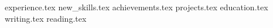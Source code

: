 \documentclass[11pt, a4paper]{awesome-cv}
\newcommand*{\sectiondir}{resume/}
\begin{document}
\makecvheader

{experience.tex}
{new_skills.tex}
{achievements.tex}
{projects.tex}
{education.tex}
{writing.tex}
{reading.tex}
\end{document}
